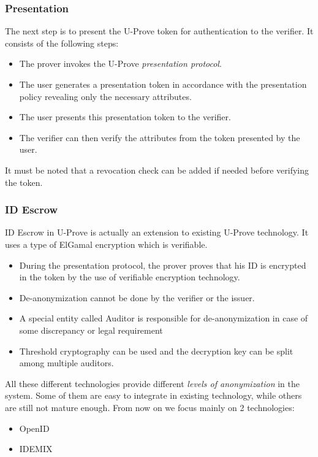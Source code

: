 \subsubsection{Presentation}
The next step is to present the U-Prove token for authentication to the verifier. It consists of the following steps:
\begin{itemize}
	\item The prover invokes the U-Prove \textit{presentation protocol}.
	\item The user generates a presentation token in accordance with the presentation policy revealing only the necessary attributes. 
	\item The user presents this presentation token to the verifier.
	\item The verifier can then verify the attributes from the token presented by the user.
\end{itemize}
It must be noted that a revocation check can be added if needed before verifying the token.
\subsubsection{ID Escrow}
ID Escrow in U-Prove is actually an extension\cite{zaverucha2013u} to existing U-Prove technology. It uses a type of ElGamal encryption which is verifiable.
\begin{itemize}
	\item  During the presentation protocol, the prover proves that his ID is encrypted in the token by the use of verifiable encryption\cite{VE} technology.
	\item De-anonymization cannot be done by the verifier or the issuer.
	\item A special entity called Auditor is responsible for de-anonymization in case of some discrepancy or legal requirement
	\item Threshold cryptography\cite{DBLP:conf/acisp/DamgardJ03} can be used and the decryption key can be split among multiple auditors.
\end{itemize}

All these different technologies provide different \textit{levels of anonymization}\cite{goldberg2000pseudonymous} in the system. Some of them are easy to integrate in existing technology, while others are still not mature enough. From now on we focus mainly on 2 technologies:
\begin{itemize}
	\item OpenID
	\item IDEMIX
\end{itemize}